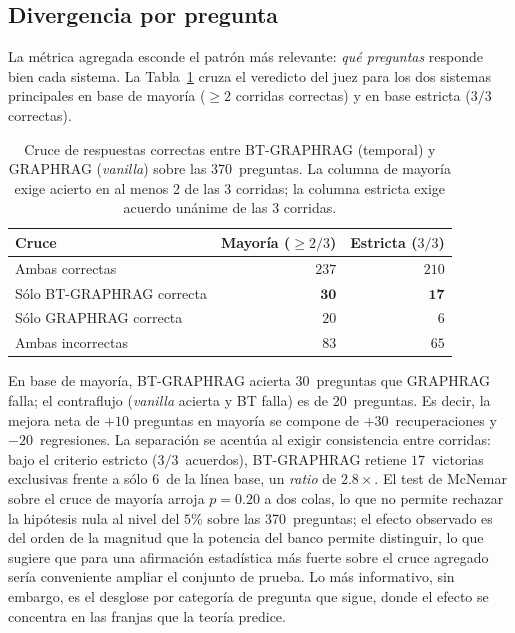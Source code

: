 \subsection{Divergencia por pregunta}\label{sec:eval-timeqa-divergence}

La métrica agregada esconde el patrón más relevante: \emph{qué preguntas} responde bien cada sistema. La Tabla~\ref{tab:eval-timeqa-divergence} cruza el veredicto del juez para los dos sistemas principales en base de mayoría ($\geq 2$ corridas correctas) y en base estricta ($3/3$ correctas).

\begin{table}[h]
\centering
\small
\begin{tabular}{lrr}
\hline
\textbf{Cruce} & \textbf{Mayoría ($\geq 2/3$)} & \textbf{Estricta ($3/3$)} \\ \hline
Ambas correctas              & $237$ & $210$ \\
Sólo BT-GRAPHRAG correcta    & $\mathbf{30}$ & $\mathbf{17}$ \\
Sólo GRAPHRAG correcta       & $20$ & $6$ \\
Ambas incorrectas            & $83$  & $65$ \\ \hline
\end{tabular}
\caption{Cruce de respuestas correctas entre BT-GRAPHRAG (temporal) y GRAPHRAG (\emph{vanilla}) sobre las 370~preguntas. La columna de mayoría exige acierto en al menos 2 de las 3 corridas; la columna estricta exige acuerdo unánime de las 3 corridas.}
\label{tab:eval-timeqa-divergence}
\end{table}

En base de mayoría, BT-GRAPHRAG acierta 30~preguntas que GRAPHRAG falla; el contraflujo (\emph{vanilla} acierta y BT falla) es de 20~preguntas. Es decir, la mejora neta de $+10$ preguntas en mayoría se compone de $+30$~recuperaciones y $-20$~regresiones. La separación se acentúa al exigir consistencia entre corridas: bajo el criterio estricto ($3/3$~acuerdos), BT-GRAPHRAG retiene $17$~victorias exclusivas frente a sólo $6$~de la línea base, un \emph{ratio} de $2.8\times$. El test de McNemar sobre el cruce de mayoría arroja $p=0.20$ a dos colas, lo que no permite rechazar la hipótesis nula al nivel del $5\%$ sobre las 370~preguntas; el efecto observado es del orden de la magnitud que la potencia del banco permite distinguir, lo que sugiere que para una afirmación estadística más fuerte sobre el cruce agregado sería conveniente ampliar el conjunto de prueba. Lo más informativo, sin embargo, es el desglose por categoría de pregunta que sigue, donde el efecto se concentra en las franjas que la teoría predice.


